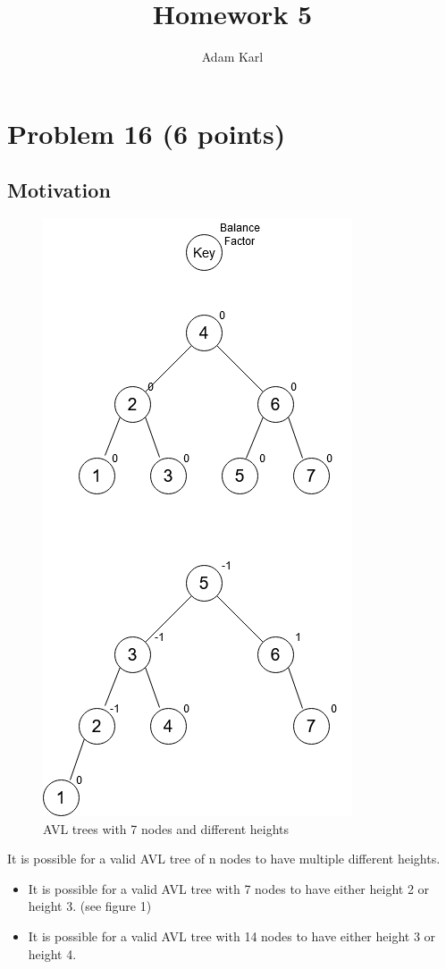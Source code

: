 \documentclass[a4paper]{article}
\title{Homework 5}
\author{Adam Karl}
\begin{document}
\maketitle

\section{Problem 16 (6 points)}
\subsection{Motivation}

\begin{figure}
\centerline{\includegraphics{7AVL.png}}
\caption{AVL trees with 7 nodes and different heights}
\label{fig}
\end{figure}

It is possible for a valid AVL tree of n nodes to have multiple different heights.
\begin{itemize}
    \item It is possible for a valid AVL tree with 7 nodes to have either height 2 or height 3. (see figure 1)
    \item It is possible for a valid AVL tree with 14 nodes to have either height 3 or height 4. 
\end{itemize}
\end{document}
